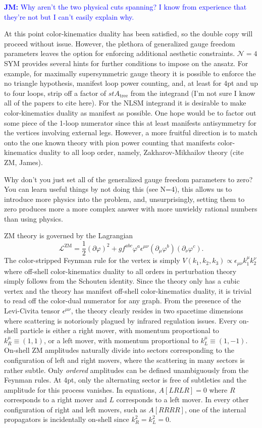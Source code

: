 \documentclass[11pt,letter]{article}
\newcommand{\jm}[1]{\textcolor{blue}{\textbf{JM: }{#1}}}
\def\be{\begin{equation}}
\def\ee{\end{equation}}
\begin{document}
\jm{Why aren't the two physical cuts spanning?  I know from experience that they're not but I can't easily explain why.}

At this point color-kinematics duality has been satisfied, so the double copy will proceed without issue.
However, the plethora of generalized gauge freedom parameters leaves the option for enforcing additional aesthetic constraints.
$\mathcal{N}=4$ SYM provides several hints for further conditions to impose on the ansatz.
For example, for maximally supersymmetric gauge theory it is possible to enforce the no triangle hypothesis, manifest loop power counting, and, at least for 4pt and up to four loops, strip off a factor of $st A_\text{tree}$ from the integrand (I'm not sure I know all of the papers to cite here).
For the NLSM integrand it is desirable to make color-kinematics duality as manifest as possible.
One hope would be to factor out some piece of the 1-loop numerator since this at least manifests antisymmetry for the vertices involving external legs.
However, a more fruitful direction is to match onto the one known theory with pion power counting that manifests color-kinematics duality to all loop order, namely, Zakharov-Mikhailov theory (cite ZM, James).

Why don't you just set all of the generalized gauge freedom parameters to zero?
You can learn useful things by not doing this (see N=4), this allows us to introduce more physics into the problem, and, unsurprisingly, setting them to zero produces more a more complex answer with more unwieldy rational numbers than using physics.

ZM theory is governed by the Lagrangian
\be
\label{eq:ZMLagrangian}
\mathcal{L}^{\text{ZM}} = \frac{1}{2}(\partial \varphi)^2 + g f^{abc} \varphi^a \epsilon^{\mu\nu}(\partial_\mu \varphi^b)( \partial_\nu \varphi^c) .
\ee
The color-stripped Feynman rule for the vertex is simply $V(k_1, k_2, k_3) \propto \epsilon_{\mu\nu}k_1^\mu k_2^\nu$ where off-shell color-kinematics duality to all orders in perturbation theory simply follows from the Schouten identity.
Since the theory only has a cubic vertex and the theory has manifest off-shell color-kinematics duality, it is trivial to read off the color-dual numerator for any graph.
From the presence of the Levi-Civita tensor $\epsilon^{\mu\nu}$, the theory clearly resides in two spacetime dimensions where scattering is notoriously plagued by infrared regulation issues.
Every on-shell particle is either a right mover, with momentum proportional to $k_R^\mu \equiv (1,1)$, or a left mover, with momentum proportional to $k_L^\mu \equiv (1,-1)$.
On-shell ZM amplitudes naturally divide into sectors corresponding to the configuration of left and right movers, where the scattering in many sectors is rather subtle.
Only \emph{ordered} amplitudes can be defined unambiguously from the Feynman rules.
At 4pt, only the alternating sector is free of subtleties and the amplitude for this process vanishes.
In equations, $A[LRLR]=0$ where $R$ corresponds to a right mover and $L$ corresponds to a left mover.
In every other configuration of right and left movers, such as $A[RRRR]$, one of the internal propagators is incidentally on-shell since $k_R^2=k_L^2=0$.
\end{document}
